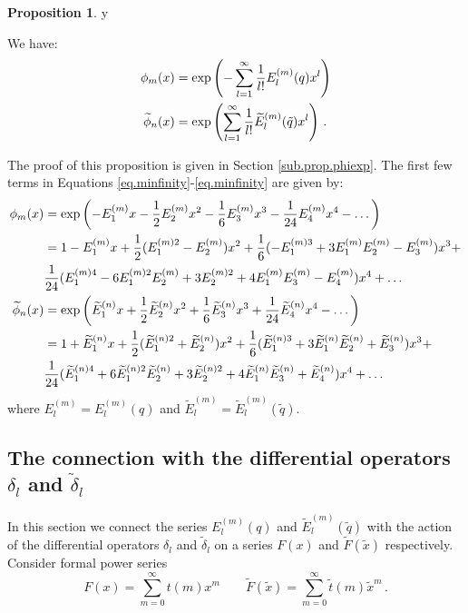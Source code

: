 \documentclass[12pt]{amsart}
\theoremstyle{definition}
\newtheorem{proposition}[theorem]{Proposition}
\def\printname#1{
        \if\draft y
                \smash{\makebox[0pt]{\hspace{-0.5in}
                        \raisebox{8pt}{\tt\tiny #1}}}
        \fi
}
\def\lbl#1{\label{#1}\printname{#1}}
\def\ti{\widetilde}
\def\tq{\tilde{q}}
\def\d{\delta}
\begin{document}
\begin{proposition}
\lbl{prop.phiexp}
We have:
\begin{subequations}
\begin{align}
\lbl{eq.minfinity}
\phi_m(x) 
&= \exp\left(-\sum_{l=1}^\infty \frac{1}{l!} E^{(m)}_l(q) x^l
\right) 
\\
\lbl{eq.ninfinity}
\ti \phi_n(x) 
&= \exp\left(\sum_{l=1}^\infty \frac{1}{l!} \ti E^{(m)}_l(\tq) x^l
\right) \,.
\end{align}
\end{subequations}
\end{proposition}
The proof of this proposition is given in Section \ref{sub.prop.phiexp}.
The first few terms in Equations \eqref{eq.minfinity}-\eqref{eq.minfinity}
are given by:
{\tiny
\begin{subequations}
\begin{align}
\lbl{eq.minfinity.terms}
\phi_m(x) 
&= \exp\left(-E^{(m)}_1 x - \frac{1}{2} E^{(m)}_2 x^2 - \frac{1}{6} E^{(m)}_3 x^3 
- \frac{1}{24} E^{(m)}_4 x^4 -\dots \right) 
\\
\notag &= 1 - E^{(m)}_1 x + \frac{1}{2} (E^{(m)2}_1 - E^{(m)}_2) x^2 + 
\frac{1}{6} (-E^{(m)3}_1 + 3 E^{(m)}_1 E^{(m)}_2 - E^{(m)}_3) x^3 + \\ &
\frac{1}{24} (E^{(m)4}_1 - 6 E^{(m)2}_1 E^{(m)}_2 + 3 E^{(m)2}_2 + 
    4 E^{(m)}_1 E^{(m)}_3 - E^{(m)}_4 )x^4 +\dots
\\
\lbl{eq.ninfinity.terms}
\ti \phi_n(x) 
&= \exp\left( \ti E^{(n)}_1 x + \frac{1}{2} \ti E^{(n)}_2 x^2 
+ \frac{1}{6} \ti E^{(n)}_3 x^3 
+ \frac{1}{24} \ti E^{(n)}_4 x^4 -\dots \right) 
\\
\notag &= 1 + \ti E^{(n)}_1 x 
+ \frac{1}{2} (\ti E^{(n)2}_1 + \ti E^{(n)}_2) x^2 + 
\frac{1}{6} (\ti E^{(n)3}_1 + 3 \ti E^{(n)}_1 \ti E^{(n)}_2 + \ti E^{(n)}_3) 
x^3 + \\ &
\frac{1}{24} (\ti E^{(n)4}_1 + 6 \ti E^{(n)2}_1 \ti E^{(n)}_2 + 3 \ti E^{(n)2}_2 + 
    4 \ti E^{(n)}_1 \ti E^{(n)}_3 + \ti E^{(n)}_4 ) x^4 +\dots
\end{align}
\end{subequations}
}
where $E^{(m)}_l=E^{(m)}_l(q)$ and $\ti E^{(m)}_l=\ti E^{(m)}_l(\tq)$.

\subsection{The connection with the differential operators 
$\d_l$ and $\ti\d_l$}

In this section we connect the series $E^{(m)}_l(q)$ and $\ti E^{(m)}_l(\tq)$
with the action of the differential operators $\d_l$ and $\ti\d_l$ on
a series $F(x)$ and $\ti F(\ti x)$ respectively.
Consider formal power series 
$$
F(x)=\sum_{m=0}^\infty t(m) x^m \qquad 
\ti F(\ti x)=\sum_{m=0}^\infty \ti t(m) \ti x^m \,.
$$
\end{document}
